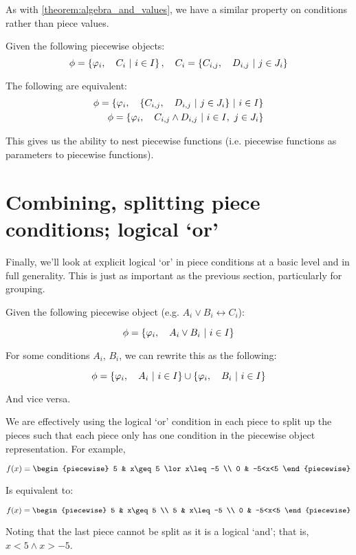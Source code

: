 \begin{theorem}
    \label{theorem:algebra_and_conditions}
    As with \ref{theorem:algebra_and_values}, we have a similar property on conditions rather than piece values.

    Given the following piecewise objects:
    $$
        \phi=\left\{\varphi_i,\quad C_i\ \middle|\ i\in I\right\},\quad C_i=\left\{C_{i,j},\quad D_{i,j}\ \middle|\ j\in J_i\right\}
    $$

    The following are equivalent:
    \begin{align*}
        \phi=\left\{\varphi_i,\quad \left\{C_{i,j},\quad D_{i,j}\ \middle|\ j\in J_i\right\}\ \middle|\ i\in I\right\} \\
        \phi=\left\{\varphi_i,\quad C_{i,j}\land D_{i,j}\ \middle|\ i\in I,\ j\in J_i\right\}
    \end{align*}

    This gives us the ability to nest piecewise functions (i.e. piecewise functions as parameters to piecewise functions).
\end{theorem}


\section{Combining, splitting piece conditions; logical `or'}
Finally, we'll look at explicit logical `or' in piece conditions at a basic level and in full generality. This is just as important as the previous section, particularly for grouping.

\begin{theorem}
    Given the following piecewise object (e.g. $A_i\lor B_i\leftrightarrow C_i$):

    $$
        \phi=\left\{\varphi_i,\quad A_i\lor B_i\ \middle|\ i\in I\right\}
    $$

    For some conditions $A_i$, $B_i$, we can rewrite this as the following:

    $$
        \phi=\left\{\varphi_i,\quad A_i\ \middle|\ i\in I\right\}\cup\left\{\varphi_i,\quad B_i\ \middle|\ i\in I\right\}
    $$

    And vice versa.

    We are effectively using the logical `or' condition in each piece to split up the pieces such that each piece only has one condition in the piecewise object representation. For example,

    $$
        f(x) = \begin{piecewise}
            5 & x\geq 5 \lor x\leq -5 \\
            0 & -5<x<5
        \end{piecewise}
    $$

    Is equivalent to:

    $$
        f(x) = \begin{piecewise}
            5 & x\geq 5 \\
            5 & x\leq -5 \\
            0 & -5<x<5
        \end{piecewise}
    $$

    Noting that the last piece cannot be split as it is a logical `and'; that is, $x<5\land x>-5$.
\end{theorem}

